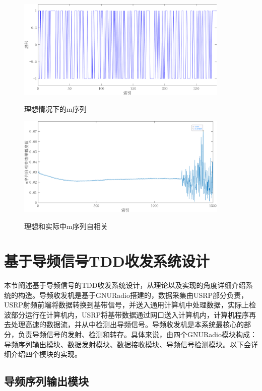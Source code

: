 \begin{figure}
    \centering
    \includegraphics[width=0.9\textwidth]{images/m_seq}
    \caption{理想情况下的m序列}{} 
    \label{m_seq}
\end{figure}

\begin{figure}
    \centering
    \includegraphics[width=0.9\textwidth]{images/m_corr_practical}
    \caption{理想和实际中m序列自相关}{} %
    \label{m_corr_practical}
\end{figure}

\section{基于导频信号TDD收发系统设计}

本节阐述基于导频信号的TDD收发系统设计，从理论以及实现的角度详细介绍系统的构造。导频收发机是基于GNURadio搭建的，数据采集由USRP部分负责，USRP射频前端将数据转换到基带信号，并送入通用计算机中处理数据，实际上检波部分运行在计算机内，USRP将基带数据通过网口送入计算机内，计算机程序再去处理高速的数据流，并从中检测出导频信号。导频收发机是本系统最核心的部分，负责导频信号的发射、检测和转存。具体来说，由四个GNURadio模块构成：导频序列输出模块、数据发射模块、数据接收模块、导频信号检测模块。以下会详细介绍四个模块的实现。

\subsection{导频序列输出模块}

